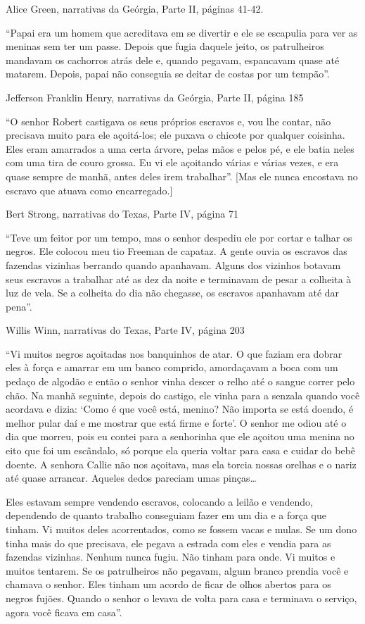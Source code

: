 Alice Green, narrativas da Geórgia, Parte II, páginas 41-42.

``Papai era um homem que acreditava em se divertir e ele se escapulia
para ver as meninas sem ter um passe. Depois que fugia daquele jeito, os
patrulheiros mandavam os cachorros atrás dele e, quando pegavam,
espancavam quase até matarem. Depois, papai não conseguia se deitar de
costas por um tempão''.

Jefferson Franklin Henry, narrativas da Geórgia, Parte II, página 185

``O senhor Robert castigava os seus próprios escravos e, vou lhe contar,
não precisava muito para ele açoitá-los; ele puxava o chicote por
qualquer coisinha. Eles eram amarrados a uma certa árvore, pelas mãos e
pelos pé, e ele batia neles com uma tira de couro grossa. Eu vi ele
açoitando várias e várias vezes, e era quase sempre de manhã, antes
deles irem trabalhar''. {[}Mas ele nunca encostava no escravo que atuava
como encarregado.{]}

Bert Strong, narrativas do Texas, Parte IV, página 71

``Teve um feitor por um tempo, mas o senhor despediu ele por cortar e
talhar os negros. Ele colocou meu tio Freeman de capataz. A gente ouvia
os escravos das fazendas vizinhas berrando quando apanhavam. Alguns dos
vizinhos botavam seus escravos a trabalhar até as dez da noite e
terminavam de pesar a colheita à luz de vela. Se a colheita do dia não
chegasse, os escravos apanhavam até dar pena''.

Willis Winn, narrativas do Texas, Parte IV, página 203

``Vi muitos negros açoitadas nos banquinhos de atar. O que faziam era
dobrar eles à força e amarrar em um banco comprido, amordaçavam a boca
com um pedaço de algodão e então o senhor vinha descer o relho até o
sangue correr pelo chão. Na manhã seguinte, depois do castigo, ele vinha
para a senzala quando você acordava e dizia: `Como é que você está,
menino? Não importa se está doendo, é melhor pular daí e me mostrar que
está firme e forte'. O senhor me odiou até o dia que morreu, pois eu
contei para a senhorinha que ele açoitou uma menina no eito que foi um
escândalo, só porque ela queria voltar para casa e cuidar do bebê
doente. A senhora Callie não nos açoitava, mas ela torcia nossas orelhas
e o nariz até quase arrancar. Aqueles dedos pareciam umas pinças\ldots{}

Eles estavam sempre vendendo escravos, colocando a leilão e vendendo,
dependendo de quanto trabalho conseguiam fazer em um dia e a força que
tinham. Vi muitos deles acorrentados, como se fossem vacas e mulas. Se
um dono tinha mais do que precisava, ele pegava a estrada com eles e
vendia para as fazendas vizinhas. Nenhum nunca fugiu. Não tinham para
onde. Vi muitos e muitos tentarem. Se os patrulheiros não pegavam, algum
branco prendia você e chamava o senhor. Eles tinham um acordo de ficar
de olhos abertos para os negros fujões. Quando o senhor o levava de
volta para casa e terminava o serviço, agora você ficava em casa''.

